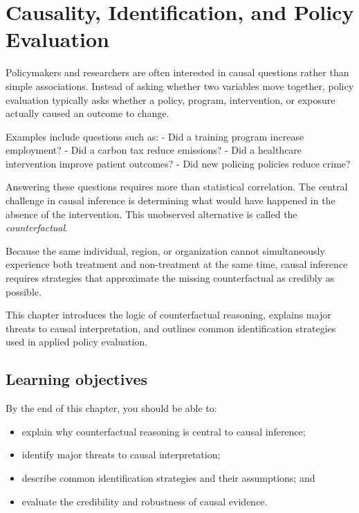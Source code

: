 \documentclass[
  11pt,
  oneside]{book}
\providecommand{\tightlist}{%
  \setlength{\itemsep}{0pt}\setlength{\parskip}{0pt}}
\begin{document}
\chapter{Causality, Identification, and Policy Evaluation}\label{causality}

Policymakers and researchers are often interested in causal questions rather than simple associations. Instead of asking whether two variables move together, policy evaluation typically asks whether a policy, program, intervention, or exposure actually caused an outcome to change.

Examples include questions such as:
- Did a training program increase employment?
- Did a carbon tax reduce emissions?
- Did a healthcare intervention improve patient outcomes?
- Did new policing policies reduce crime?

Answering these questions requires more than statistical correlation. The central challenge in causal inference is determining what would have happened in the absence of the intervention. This unobserved alternative is called the \emph{counterfactual}.

Because the same individual, region, or organization cannot simultaneously experience both treatment and non-treatment at the same time, causal inference requires strategies that approximate the missing counterfactual as credibly as possible.

This chapter introduces the logic of counterfactual reasoning, explains major threats to causal interpretation, and outlines common identification strategies used in applied policy evaluation.

\section{Learning objectives}\label{learning-objectives-6}

By the end of this chapter, you should be able to:

\begin{itemize}
\tightlist
\item
  explain why counterfactual reasoning is central to causal inference;
\item
  identify major threats to causal interpretation;
\item
  describe common identification strategies and their assumptions; and
\item
  evaluate the credibility and robustness of causal evidence.
\end{itemize}
\end{document}
